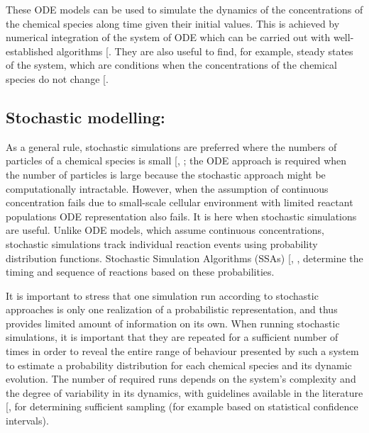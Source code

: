 \documentclass[
  11pt,
  letterpaper,
]{scrreprt}
\begin{document}
These ODE models can be used to simulate the dynamics of the
concentrations of the chemical species along time given their initial
values. This is achieved by numerical integration of the system of ODE
which can be carried out with well-established algorithms
{[}\citeproc{ref-postawa2020Comprehensive}{277}{]}. They are also useful
to find, for example, steady states of the system, which are conditions
when the concentrations of the chemical species do not change
{[}\citeproc{ref-maly2009Introduction}{278}{]}.

\subsection*{Stochastic modelling:}\label{stochastic-modelling}

As a general rule, stochastic simulations are preferred where the
numbers of particles of a chemical species is small
{[},
\citeproc{ref-gillespie2007Stochastic}{279}{]}; the ODE approach is
required when the number of particles is large because the stochastic
approach might be computationally intractable. However, when the
assumption of continuous concentration fails due to small-scale cellular
environment with limited reactant populations ODE representation also
fails. It is here when stochastic simulations are useful. Unlike ODE
models, which assume continuous concentrations, stochastic simulations
track individual reaction events using probability distribution
functions. Stochastic Simulation Algorithms (SSAs)
{[},
\citeproc{ref-gillespie2007Stochastic}{279}{]}, determine the timing and
sequence of reactions based on these probabilities.

It is important to stress that one simulation run according to
stochastic approaches is only one realization of a probabilistic
representation, and thus provides limited amount of information on its
own. When running stochastic simulations, it is important that they are
repeated for a sufficient number of times in order to reveal the entire
range of behaviour presented by such a system to estimate a probability
distribution for each chemical species and its dynamic evolution. The
number of required runs depends on the system's complexity and the
degree of variability in its dynamics, with guidelines available in the
literature {[},
\citeproc{ref-byrne2013How}{281}{]} for determining sufficient sampling
(for example based on statistical confidence intervals).
\end{document}
